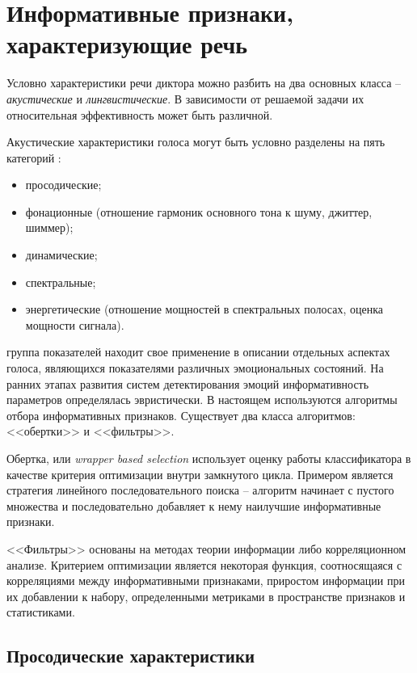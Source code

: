 \chapter[Информативные признаки, характеризующие речь]{Информативные признаки, характеризующие речь}
Условно характеристики речи диктора можно разбить на два основных
класса -- \textit{акустические} и \textit{лингвистические}. В зависимости от решаемой задачи
их относительная эффективность может быть различной. \cite{speech-patterns}

 Акустические характеристики голоса могут быть условно разделены на пять категорий \cite{categories}:
\begin{itemize}
	\item просодические;
	\item фонационные (отношение гармоник основного тона к шуму, джиттер, шиммер);
	\item динамические;
	\item спектральные;
	\item энергетические (отношение мощностей в спектральных полосах, оценка мощности сигнала).
\end{itemize}

 группа показателей находит свое применение в описании отдельных аспектах голоса, являющихся показателями различных эмоциональных состояний. На ранних этапах развития систем детектирования эмоций информативность параметров определялась эвристически. В настоящем используются алгоритмы отбора информативных признаков. Существует два класса алгоритмов: <<обертки>> и  <<фильтры>>.

Обертка, или \textit{wrapper based selection} использует оценку работы классификатора в качестве критерия оптимизации внутри замкнутого цикла. Примером является стратегия линейного последовательного поиска -- алгоритм начинает с пустого множества и последовательно
добавляет к нему наилучшие информативные признаки. \cite{wrapper}

<<Фильтры>> основаны на методах теории информации либо корреляционном анализе. Критерием оптимизации является некоторая функция, соотносящаяся с корреляциями между информативными признаками, приростом информации при их  добавлении к набору, определенными метриками в пространстве признаков и статистиками. \cite{filter}

\section{Просодические характеристики}

